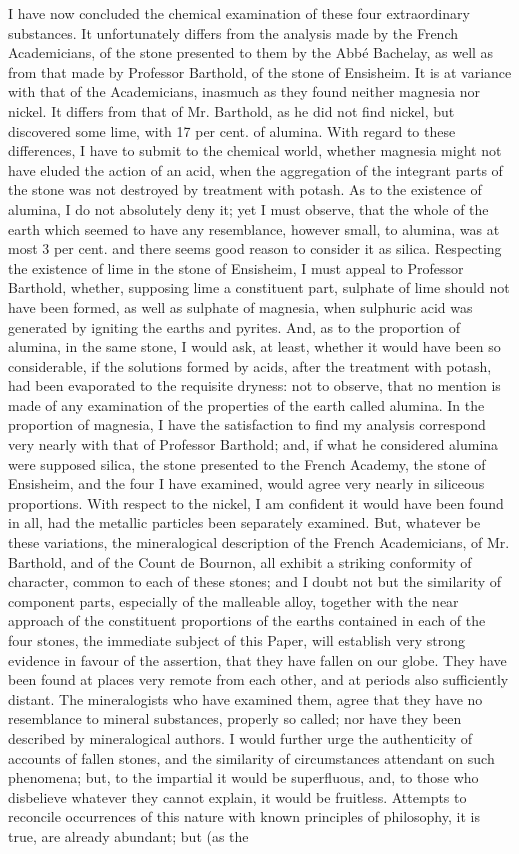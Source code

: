 \documentclass[a4paper, 12pt, oneside]{article}
\begin{document}
I have now concluded the chemical examination of these four extraordinary substances. It unfortunately differs from the analysis made by the French Academicians, of the stone presented to them by the Abbé Bachelay, as well as from that made by Professor Barthold, of the stone of Ensisheim. It is at variance with that of the Academicians, inasmuch as they found neither magnesia nor nickel. It differs from that of Mr. Barthold, as he did not find nickel, but discovered some lime, with 17 per cent. of alumina. With regard to these differences, I have to submit to the chemical world, whether magnesia might not have eluded the action of an acid, when the aggregation of the integrant parts of the stone was not destroyed by treatment with potash. As to the existence of alumina, I do not absolutely deny it; yet I must observe, that the whole of the earth which seemed to have any resemblance, however small, to alumina, was at most 3 per cent. and there seems good reason to consider it as silica. Respecting the existence of lime in the stone of Ensisheim, I must appeal to Professor Barthold, whether, supposing lime a constituent part, sulphate of lime should not have been formed, as well as sulphate of magnesia, when sulphuric acid was generated by igniting the earths and pyrites. And, as to the proportion of alumina, in the same stone, I would ask, at least, whether it would have been so considerable, if the solutions formed by acids, after the treatment with potash, had been evaporated to the requisite dryness: not to observe, that no mention is made of any examination of the properties of the earth called alumina. In the proportion of magnesia, I have the satisfaction to find my analysis correspond very nearly with that of Professor Barthold; and, if what he considered alumina were supposed silica, the stone presented to the French Academy, the stone of Ensisheim, and the four I have examined, would agree very nearly in siliceous proportions. With respect to the nickel, I am confident it would have been found in all, had the metallic particles been separately examined. But, whatever be these variations, the mineralogical description of the French Academicians, of Mr. Barthold, and of the Count de Bournon, all exhibit a striking conformity of character, common to each of these stones; and I doubt not but the similarity of component parts, especially of the malleable alloy, together with the near approach of the constituent proportions of the earths contained in each of the four stones, the immediate subject of this Paper, will establish very strong evidence in favour of the assertion, that they have fallen on our globe. They have been found at places very remote from each other, and at periods also sufficiently distant. The mineralogists who have examined them, agree that they have no resemblance to mineral substances, properly so called; nor have they been described by mineralogical authors. I would further urge the authenticity of accounts of fallen stones, and the similarity of circumstances attendant on such phenomena; but, to the impartial it would be superfluous, and, to those who disbelieve whatever they cannot explain, it would be fruitless. Attempts to reconcile occurrences of this nature with known principles of philosophy, it is true, are already abundant; but (as the 
\end{document}
